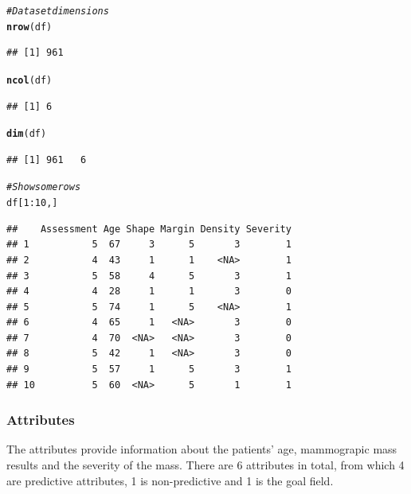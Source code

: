 \documentclass[a4paper,12pt]{article}\usepackage[]{graphicx}\usepackage[]{color}
\makeatletter
\newcommand{\hlnum}[1]{\textcolor[rgb]{0.686,0.059,0.569}{#1}}%
\newcommand{\hlcom}[1]{\textcolor[rgb]{0.678,0.584,0.686}{\textit{#1}}}%
\newcommand{\hlopt}[1]{\textcolor[rgb]{0,0,0}{#1}}%
\newcommand{\hlstd}[1]{\textcolor[rgb]{0.345,0.345,0.345}{#1}}%
\newcommand{\hlkwd}[1]{\textcolor[rgb]{0.737,0.353,0.396}{\textbf{#1}}}%
\newenvironment{kframe}{%
 \def\at@end@of@kframe{}%
 \ifinner\ifhmode%
  \def\at@end@of@kframe{\end{minipage}}%
  \begin{minipage}{\columnwidth}%
 \fi\fi%
 \def\FrameCommand##1{\hskip\@totalleftmargin \hskip-\fboxsep
 \colorbox{shadecolor}{##1}\hskip-\fboxsep
     \hskip-\linewidth \hskip-\@totalleftmargin \hskip\columnwidth}%
 \MakeFramed {\advance\hsize-\width
   \@totalleftmargin\z@ \linewidth\hsize
   \@setminipage}}%
 {\par\unskip\endMakeFramed%
 \at@end@of@kframe}
\newenvironment{knitrout}{}{} %
\makeatother
\begin{document}
\begin{knitrout}
\color{fgcolor}\begin{kframe}
\begin{alltt}
\hlcom{# Dataset dimensions}
\hlkwd{nrow}\hlstd{(df)}
\end{alltt}
\begin{verbatim}
## [1] 961
\end{verbatim}
\begin{alltt}
\hlkwd{ncol}\hlstd{(df)}
\end{alltt}
\begin{verbatim}
## [1] 6
\end{verbatim}
\begin{alltt}
\hlkwd{dim}\hlstd{(df)}
\end{alltt}
\begin{verbatim}
## [1] 961   6
\end{verbatim}
\begin{alltt}
\hlcom{# Show some rows}
\hlstd{df[}\hlnum{1}\hlopt{:}\hlnum{10}\hlstd{,]}
\end{alltt}
\begin{verbatim}
##    Assessment Age Shape Margin Density Severity
## 1           5  67     3      5       3        1
## 2           4  43     1      1    <NA>        1
## 3           5  58     4      5       3        1
## 4           4  28     1      1       3        0
## 5           5  74     1      5    <NA>        1
## 6           4  65     1   <NA>       3        0
## 7           4  70  <NA>   <NA>       3        0
## 8           5  42     1   <NA>       3        0
## 9           5  57     1      5       3        1
## 10          5  60  <NA>      5       1        1
\end{verbatim}
\end{kframe}
\end{knitrout}

\clearpage

\subsubsection{Attributes}\label{attributes}
The attributes provide information about the patients' age, mammograpic mass results and the severity of the mass. There are 6 attributes in total, from which 4 are predictive attributes, 1 is non-predictive and 1 is the goal field. 
\end{document}
